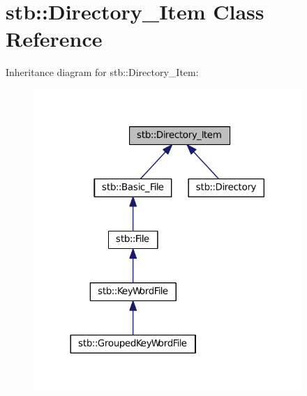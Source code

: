 \hypertarget{classstb_1_1Directory__Item}{\section{stb\+:\+:Directory\+\_\+\+Item Class Reference}
\label{classstb_1_1Directory__Item}
}


Inheritance diagram for stb\+:\+:Directory\+\_\+\+Item\+:
\nopagebreak
\begin{figure}[H]
\begin{center}
\leavevmode
\includegraphics[width=288pt]{classstb_1_1Directory__Item__inherit__graph}
\end{center}
\end{figure}
